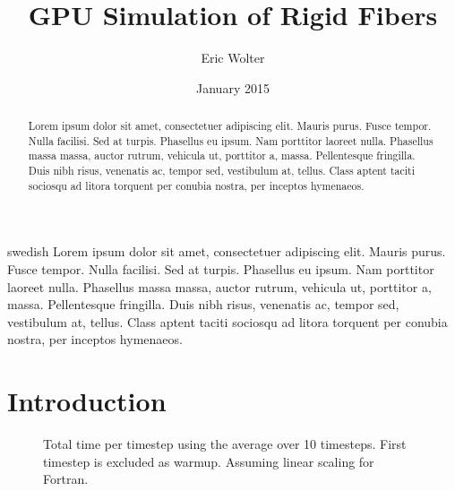 \documentclass[a4paper,11pt]{kth-mag}
\title{GPU Simulation of Rigid Fibers}
\author{Eric Wolter}
\date{January 2015}
\begin{document}
\frontmatter
\pagestyle{empty}

\maketitle
{}
\begin{abstract}
Lorem ipsum dolor sit amet, consectetuer adipiscing elit. Mauris
purus. Fusce tempor. Nulla facilisi. Sed at turpis. Phasellus eu
ipsum. Nam porttitor laoreet nulla. Phasellus massa massa, auctor
rutrum, vehicula ut, porttitor a, massa. Pellentesque fringilla. Duis
nibh risus, venenatis ac, tempor sed, vestibulum at, tellus. Class
aptent taciti sociosqu ad litora torquent per conubia nostra, per
inceptos hymenaeos.
\end{abstract}

\clearpage


\begin{foreignabstract}{swedish}
Lorem ipsum dolor sit amet, consectetuer adipiscing elit. Mauris
purus. Fusce tempor. Nulla facilisi. Sed at turpis. Phasellus eu
ipsum. Nam porttitor laoreet nulla. Phasellus massa massa, auctor
rutrum, vehicula ut, porttitor a, massa. Pellentesque fringilla. Duis
nibh risus, venenatis ac, tempor sed, vestibulum at, tellus. Class
aptent taciti sociosqu ad litora torquent per conubia nostra, per
inceptos hymenaeos.
\end{foreignabstract}

\clearpage

\tableofcontents*

\mainmatter
\pagestyle{newchap}

\chapter{Introduction}

\begin{figure}
  \centering
  \caption{Total time per timestep using the average over 10 timesteps. First timestep is excluded as warmup. Assuming linear scaling for Fortran.}
\end{figure}
\end{document}
